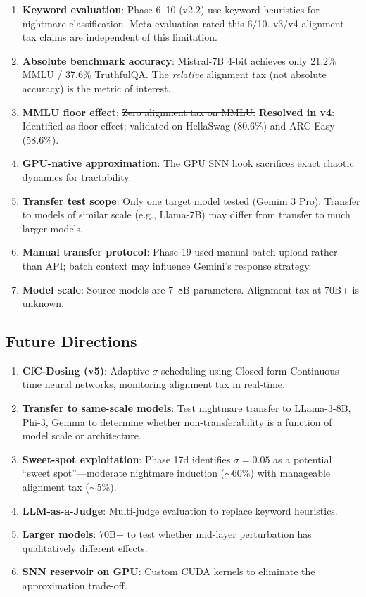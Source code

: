 \documentclass[11pt,a4paper]{article}
\begin{document}
\begin{enumerate}
    \item \textbf{Keyword evaluation}: Phase 6--10 (v2.2) use keyword heuristics for nightmare classification. Meta-evaluation rated this 6/10. v3/v4 alignment tax claims are independent of this limitation.
    \item \textbf{Absolute benchmark accuracy}: Mistral-7B 4-bit achieves only 21.2\% MMLU / 37.6\% TruthfulQA. The \emph{relative} alignment tax (not absolute accuracy) is the metric of interest.
    \item \textbf{MMLU floor effect}: \sout{Zero alignment tax on MMLU.} \textbf{Resolved in v4}: Identified as floor effect; validated on HellaSwag (80.6\%) and ARC-Easy (58.6\%).
    \item \textbf{GPU-native approximation}: The GPU SNN hook sacrifices exact chaotic dynamics for tractability.
    \item \textbf{Transfer test scope}: Only one target model tested (Gemini 3 Pro). Transfer to models of similar scale (e.g., Llama-7B) may differ from transfer to much larger models.
    \item \textbf{Manual transfer protocol}: Phase 19 used manual batch upload rather than API; batch context may influence Gemini's response strategy.
    \item \textbf{Model scale}: Source models are 7--8B parameters. Alignment tax at 70B+ is unknown.
\end{enumerate}

\subsection{Future Directions}

\begin{enumerate}
    \item \textbf{CfC-Dosing (v5)}: Adaptive $\sigma$ scheduling using Closed-form Continuous-time neural networks, monitoring alignment tax in real-time.
    \item \textbf{Transfer to same-scale models}: Test nightmare transfer to LLama-3-8B, Phi-3, Gemma to determine whether non-transferability is a function of model scale or architecture.
    \item \textbf{Sweet-spot exploitation}: Phase 17d identifies $\sigma = 0.05$ as a potential ``sweet spot''---moderate nightmare induction ($\sim$60\%) with manageable alignment tax ($\sim$5\%).
    \item \textbf{LLM-as-a-Judge}: Multi-judge evaluation to replace keyword heuristics.
    \item \textbf{Larger models}: 70B+ to test whether mid-layer perturbation has qualitatively different effects.
    \item \textbf{SNN reservoir on GPU}: Custom CUDA kernels to eliminate the approximation trade-off.
\end{enumerate}
\end{document}
